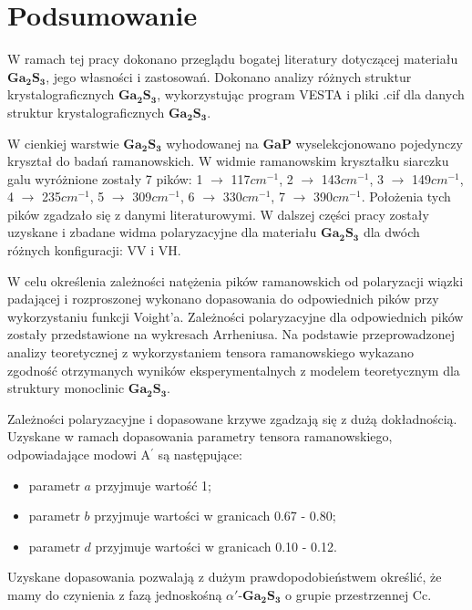\newpage

\section{Podsumowanie}

W ramach tej pracy dokonano przeglądu bogatej literatury dotyczącej materiału $\mathbf{Ga_{2}S_{3}}$, jego własności i zastosowań. Dokonano analizy różnych struktur krystalograficznych $\mathbf{Ga_{2}S_{3}}$, wykorzystując program VESTA i pliki .cif dla danych struktur krystalograficznych $\mathbf{Ga_{2}S_{3}}$.

W cienkiej warstwie $\mathbf{Ga_{2}S_{3}}$ wyhodowanej na $\mathbf{GaP}$ wyselekcjonowano pojedynczy kryształ do badań ramanowskich.
W widmie ramanowskim kryształku siarczku galu wyróżnione zostały 7 pików: 1 $\rightarrow$ 117$cm^{-1}$, 2 $\rightarrow$ 143$cm^{-1}$, 3 $\rightarrow$ 149$cm^{-1}$, 4 $\rightarrow$ 235$cm^{-1}$, 5 $\rightarrow$ 309$cm^{-1}$, 6 $\rightarrow$ 330$cm^{-1}$, 7 $\rightarrow$ 390$cm^{-1}$. Położenia tych pików zgadzało się z danymi literaturowymi. W dalszej części pracy zostały uzyskane i zbadane widma polaryzacyjne dla materiału $\mathbf{Ga_{2}S_{3}}$ dla dwóch różnych konfiguracji: VV i VH. 

W celu określenia zależności natężenia pików ramanowskich od polaryzacji wiązki padającej i rozproszonej wykonano dopasowania do odpowiednich pików przy wykorzystaniu funkcji Voight'a. Zależności polaryzacyjne dla odpowiednich pików zostały przedstawione na wykresach Arrheniusa. Na podstawie przeprowadzonej analizy teoretycznej z wykorzystaniem tensora ramanowskiego wykazano zgodność otrzymanych wyników eksperymentalnych z modelem teoretycznym dla struktury monoclinic $\mathbf{Ga_{2}S_{3}}$.

Zależności polaryzacyjne i dopasowane krzywe zgadzają się z dużą dokładnością. Uzyskane w ramach dopasowania parametry tensora ramanowskiego, odpowiadające modowi A$^{'}$ są następujące:
\begin{itemize}
	\item parametr $a$ przyjmuje wartość 1;
	\item parametr $b$ przyjmuje wartości w granicach 0.67 - 0.80;
	\item parametr $d$ przyjmuje wartości w granicach 0.10 - 0.12.
\end{itemize}

Uzyskane dopasowania pozwalają z dużym prawdopodobieństwem określić, że mamy do czynienia z fazą jednoskośną $\alpha'$-$\mathbf{Ga_{2}S_{3}}$ o grupie przestrzennej Cc.

